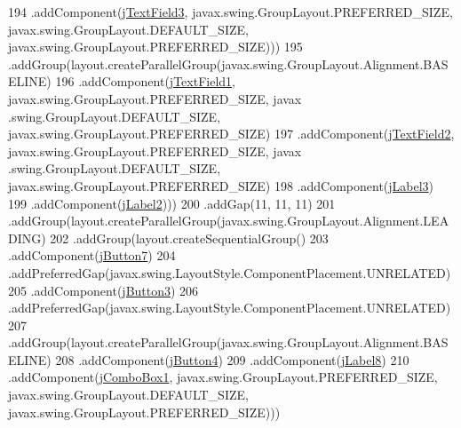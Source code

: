 \begin{DoxyCode}
194                             .addComponent(\mbox{\hyperlink{class_interfaz_package_1_1_consulta_busqueda_a1898d78ec07cfb8e5e74b50bce3e6239}{jTextField3}}, javax.swing.GroupLayout.PREFERRED\_SIZE, 
      javax.swing.GroupLayout.DEFAULT\_SIZE, javax.swing.GroupLayout.PREFERRED\_SIZE)))
195                     .addGroup(layout.createParallelGroup(javax.swing.GroupLayout.Alignment.BASELINE)
196                         .addComponent(\mbox{\hyperlink{class_interfaz_package_1_1_consulta_busqueda_a268df17df2147b480825a6af3128683e}{jTextField1}}, javax.swing.GroupLayout.PREFERRED\_SIZE, javax
      .swing.GroupLayout.DEFAULT\_SIZE, javax.swing.GroupLayout.PREFERRED\_SIZE)
197                         .addComponent(\mbox{\hyperlink{class_interfaz_package_1_1_consulta_busqueda_aa92702c5bdc2128ce8e45ce2edd99543}{jTextField2}}, javax.swing.GroupLayout.PREFERRED\_SIZE, javax
      .swing.GroupLayout.DEFAULT\_SIZE, javax.swing.GroupLayout.PREFERRED\_SIZE)
198                         .addComponent(\mbox{\hyperlink{class_interfaz_package_1_1_consulta_busqueda_ac2ce384e0d5b1405b8a3cfec2683a020}{jLabel3}})
199                         .addComponent(\mbox{\hyperlink{class_interfaz_package_1_1_consulta_busqueda_a875cc70442f93c7e077251d0fb0f30f9}{jLabel2}})))
200                 .addGap(11, 11, 11)
201                 .addGroup(layout.createParallelGroup(javax.swing.GroupLayout.Alignment.LEADING)
202                     .addGroup(layout.createSequentialGroup()
203                         .addComponent(\mbox{\hyperlink{class_interfaz_package_1_1_consulta_busqueda_a80ca243a28d5b45e1f3a0e97c5cfb819}{jButton7}})
204                         .addPreferredGap(javax.swing.LayoutStyle.ComponentPlacement.UNRELATED)
205                         .addComponent(\mbox{\hyperlink{class_interfaz_package_1_1_consulta_busqueda_ad28b7024dc55d1785ac611b91dab6030}{jButton3}})
206                         .addPreferredGap(javax.swing.LayoutStyle.ComponentPlacement.UNRELATED)
207                         .addGroup(layout.createParallelGroup(javax.swing.GroupLayout.Alignment.BASELINE)
208                             .addComponent(\mbox{\hyperlink{class_interfaz_package_1_1_consulta_busqueda_a3c5a2c3d6a507e80ad771d8ab4ebd891}{jButton4}})
209                             .addComponent(\mbox{\hyperlink{class_interfaz_package_1_1_consulta_busqueda_ade14e21c50a0fe22a685656e3815a253}{jLabel8}})
210                             .addComponent(\mbox{\hyperlink{class_interfaz_package_1_1_consulta_busqueda_ab0737507a855f158ca16439d3df67b4e}{jComboBox1}}, javax.swing.GroupLayout.PREFERRED\_SIZE, 
      javax.swing.GroupLayout.DEFAULT\_SIZE, javax.swing.GroupLayout.PREFERRED\_SIZE)))

\end{DoxyCode}
